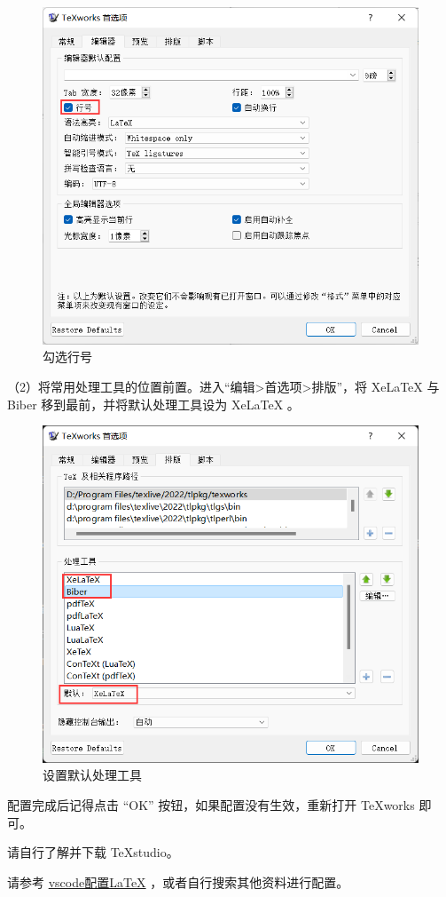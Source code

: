\begin{figure}[H]  %
  \centering  %
  \includegraphics[scale=.45]{figure/texworkln.png}  %
  \caption{勾选行号}  %
  \label{fig:tools:texworkln}  %
\end{figure}

（2）将常用处理工具的位置前置。进入“编辑>首选项>排版”，将 XeLaTeX 与 Biber 移到最前，并将默认处理工具设为 XeLaTeX 。

\begin{figure}[H]  %
  \centering  %
  \includegraphics[scale=.45]{figure/texworkpt.png}  %
  \caption{设置默认处理工具}  %
  \label{fig:tools:texworkpt}  %
\end{figure}

配置完成后记得点击 “OK” 按钮，如果配置没有生效，重新打开 \TeX{works} 即可。


请自行了解并下载 \TeX{studio}。

请参考 \href{https://zhuanlan.zhihu.com/p/166523064}{vscode配置LaTeX} ，或者自行搜索其他资料进行配置。
